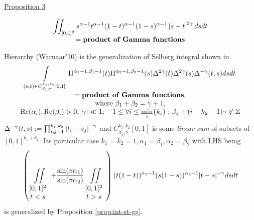 \documentclass[pdf,notes]{beamer}
\newcommand{\mypgf}{{\mbox{\bf product of Gamma functions}}}
\newcommand{\nin}{\not\in}
\newcommand{\tmop}[1]{\ensuremath{\operatorname{#1}}}
\begin{document}
\begin{frame}[fragile]
\begin{flushright}
			\ul{Proposition 3}
		\end{flushright}
		\begin{flushright}
			\hspace{0.5\textwidth}
		\end{flushright}
		\vspace{-40pt}
			\begin{equation*}
				\begin{array}[]{c}
				\displaystyle\iint_{[0, 1]^2} s^{\alpha-1}t^{\alpha-1}(1-t)^{\alpha-1}(1-s)^{\alpha-1} \myabs{s-t}^{2\gamma} dsdt
				\\=\mypgf
				\end{array}
			\end{equation*}
\end{frame}
\begin{frame}{Hierarchy (Warnaar'10)}
	\scriptsize
	 is the generalization of Selberg integral shown in \cite[(1.4)]{warnaar2010sl3}\begin{equation*}
			\begin{array}{c}
				  \displaystyle\int_{(s, t) \in C_{\beta_1, \gamma}^{k_1, k_2} [0, 1]} \Pi^{\alpha_1 - 1,
					    \beta_1 - 1} (t) \Pi^{\alpha_2 - 1, \beta_2 - 1} (s) \Delta^{2 \gamma} (t)
					      \Delta^{2 \gamma} (s) \Delta^{- \gamma} (t, s) d s d t\\
					        = \mypgf,\\
					  \mbox{where }\beta_1 + \beta_2 = \gamma + 1,\\
					    \tmop{Re} (\alpha_i), \tmop{Re} (\beta_i) > 0,  \myabs{\gamma} \ll 1 ; \quad 1
						\le \forall i \le \displaystyle\min_i \{ k_i \} : \beta_1 + (i - k_2 - 1)
						  \gamma \nin \mathbb{Z}
			\end{array}
			\end{equation*}
			$\Delta^{-\gamma}(t,s):=\prod_{i,j=1}^{k_1,k_2}\left|t_i-s_j\right|^{-\gamma}$ and $C^{k_1,k_2}_{\beta_1,\gamma}[0,1]$ is some {\it linear sum} of subsets of $[0,1]^{k_1+k_2}$.
			Its particular case $k_1=k_2=1,\alpha_1=\beta_1,\alpha_2=\beta_2$ with LHS being\begin{equation*}
				\left(\displaystyle\iint\displaylimits_{\begin{array}[]{c}
					[0,1]^2\\t<s
				\end{array}}+\frac{\sin(\pi\alpha_1)}{\sin(\pi\alpha_2)}\displaystyle\iint\displaylimits_{\begin{array}[]{c}
					[0,1]^2\\t>s
			\end{array}} \right)(t(1-t))^{\alpha_1 - 1}  (s(1-s))^{\alpha_2 - 1}  | t - s |^{- \gamma} d s d t
			\end{equation*}
			is generalized by Proposition \ref{prop:int-st-gg}.
\end{frame}
\end{document}
